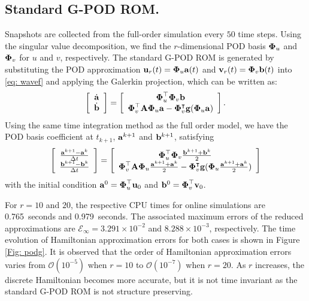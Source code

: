 \documentclass[11pt]{article}
\begin{document}
\subsection{Standard G-POD ROM.}
\noindent \indent Snapshots are collected from the full-order simulation every $50$ time steps.
Using the singular value decomposition, we find the $r$-dimensional POD basis $\boldsymbol{\Phi}_u$ and $\boldsymbol{\Phi}_v$ for $u$ and $v$, respectively.
The standard G-POD ROM is generated by substituting the POD approximation ${\bf u}_r(t) = \boldsymbol{\Phi}_u {\bf a}(t)$ and ${\bf v}_r(t) = \boldsymbol{\Phi}_v {\bf b}(t)$ into \eqref{eq: wavef} and applying the Galerkin projection, which can be written as: 
\begin{equation*}
\left[
\begin{array}{c}
\dot{{\bf a}}\\
\dot{{\bf b}}
\end{array}
\right] =
\left[
\begin{array}{c}
\boldsymbol{\Phi}_u^\top\boldsymbol{\Phi}_v {\bf b}\\
 \boldsymbol{\Phi}_v^\top{\bf A} \boldsymbol{\Phi}_u {\bf a} - \boldsymbol{\Phi}_v^\intercal {\bf g}(\boldsymbol{\Phi}_u {\bf a})
\end{array}
\right].
\label{eq:lin_wave_rom}
\end{equation*}
%
Using the same time integration method as the full order model, we have the POD basis coefficient at $t_{k+1}$, ${\bf a}^{k+1}$ and ${\bf b}^{k+1}$, satisfying
\begin{equation*}
\left[
\begin{array}{c}
\frac{{\bf a}^{k+1}-{\bf a}^{k}}{\Delta t}\\
\frac{{\bf b}^{k+1}-{\bf b}^{k}}{\Delta t}
\end{array}
\right] =
\left[
\begin{array}{c}
\boldsymbol{\Phi}_u^\top\boldsymbol{\Phi}_v \frac{{\bf b}^{k+1}+{\bf b}^{k}}{2}\\
\boldsymbol{\Phi}_v^\top{\bf A} \boldsymbol{\Phi}_u \frac{{\bf a}^{k+1}+{\bf a}^{k}}{2}- \boldsymbol{\Phi}_v^\intercal {\bf g}(\boldsymbol{\Phi}_u \frac{{\bf a}^{k+1}+{\bf a}^{k}}{2})
\end{array}
\right]
\label{eq:lin_wave_rom_dis}
\end{equation*}
with the initial condition ${\bf a}^0 = \boldsymbol{\Phi}_u^\top {\bf u}_0$ and ${\bf b}^0 = \boldsymbol{\Phi}_v^\top {\bf v}_0$.

For $r=10$ and $20$, the respective CPU times for online simulations are 0.765~seconds and 0.979~seconds. The associated maximum errors of the reduced approximations are $\mathcal{E}_\infty= 3.291\times 10^{-2}$ and $8.288\times 10^{-3}$, respectively.
The time evolution of Hamiltonian approximation errors for both cases is shown in Figure \ref{Fig: podg}. 
It is observed that the order of Hamiltonian approximation errors varies from $\mathcal{O}(10^{-5})$ when $r=10$ to $\mathcal{O}(10^{-7})$ when $r=20$. 
As $r$ increases, the discrete Hamiltonian becomes more accurate, but it is not time invariant as the standard G-POD ROM is not structure preserving. 
\end{document}
